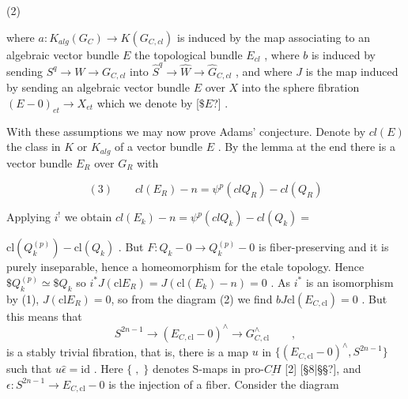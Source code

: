 \documentclass[11pt]{article}
\newcommand{\scanpage}[1]{\par\bigskip\noindent{\small\sffamily[scan #1]}\par}
\newcommand{\mspage}[1]{{\small\sffamily[p.\,#1]}}
\newcommand{\hand}[1]{\textcolor{blue}{#1}}
\newcommand{\unsure}[1]{[#1?]}
\newenvironment{diagramblock}{\par\begin{center}}{\end{center}\par}
\begin{document}
(2)
\begin{diagramblock}
\end{diagramblock}

where $a:K_{alg}(G_C) \to K(G_{C,cl})$ is induced by the map associating to
an algebraic vector bundle $E$ the topological bundle $E_{cl}$ , where
$b$ is induced by sending $S^q \to W \to G_{C,cl}$ into $\hat{S}^q \to \hat{W} \to \hat{G}_{C,cl}$ ,
and where $J$ is the map induced by sending an algebraic vector
bundle $E$ over $X$ into the sphere fibration $(E - 0)_{et} \to X_{et}$
which we denote by \unsure{$\$E$} .

With these assumptions we may now prove Adams' conjecture.
Denote by $cl(E)$ the class in $K$ or $K_{alg}$ of a vector bundle $E$ .
By the lemma at the end there is a vector bundle $E_R$ over $G_R$ with

\[ (3) \qquad cl(E_R) - n = \psi^p(clQ_R) - cl(Q_R) \]

Applying $i^!$ we obtain $cl(E_k) - n = \psi^p(clQ_k) - cl(Q_k) =$

\mspage{\hand{60}}

\clearpage
\scanpage{162-5/61}
\mspage{- 5 -}

$\mathrm{cl}(Q_k^{(p)}) - \mathrm{cl}(Q_k)$ .  But  $F:Q_k - 0 \to Q_k^{(p)} - 0$  is fiber-preserving
and it is purely inseparable, hence a homeomorphism for the etale
topology.  Hence  $\$Q_k^{(p)} \simeq \$Q_k$  so  $i^*J(\mathrm{cl}E_R) = J(\mathrm{cl}(E_k) - n) = 0$ .
As  $i^*$ is an isomorphism by (1), $J(\mathrm{cl}E_R) = 0$, so from the diagram
(2) we find  $bJ\mathrm{cl}(E_{C,\mathrm{cl}}) = 0$ .  But this means that
\[ S^{2n-1} \to (E_{C,\mathrm{cl}} - 0)^{\wedge} \to G^{\wedge}_{C,\mathrm{cl}} \qquad , \]
is a stably trivial fibration, that is, there is a map  $u$  in
$\{(E_{C,\mathrm{cl}} - 0)^{\wedge} , S^{2n-1}\}$  such that  $u\hat{\epsilon} = \mathrm{id}$ .  Here  $\{ \; , \; \}$  denotes
S-maps in pro-$\underline{CH}$  [2] \unsure{§8|§§}, and  $\epsilon:S^{2n-1} \to E_{C,\mathrm{cl}} - 0$  is the injection
of a fiber.  Consider the diagram
\end{document}
